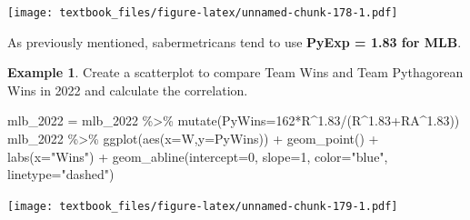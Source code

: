 \documentclass[
  11pt,
]{book}
\newenvironment{Shaded}{\begin{snugshade}}{\end{snugshade}}
\newcommand{\AttributeTok}[1]{\textcolor[rgb]{0.77,0.63,0.00}{#1}}
\newcommand{\DecValTok}[1]{\textcolor[rgb]{0.00,0.00,0.81}{#1}}
\newcommand{\FloatTok}[1]{\textcolor[rgb]{0.00,0.00,0.81}{#1}}
\newcommand{\FunctionTok}[1]{\textcolor[rgb]{0.00,0.00,0.00}{#1}}
\newcommand{\NormalTok}[1]{#1}
\newcommand{\OtherTok}[1]{\textcolor[rgb]{0.56,0.35,0.01}{#1}}
\newcommand{\SpecialCharTok}[1]{\textcolor[rgb]{0.00,0.00,0.00}{#1}}
\newcommand{\StringTok}[1]{\textcolor[rgb]{0.31,0.60,0.02}{#1}}
\theoremstyle{definition}
\theoremstyle{definition}
\newtheorem{example}{Example}[chapter]
\theoremstyle{definition}
\theoremstyle{definition}
\theoremstyle{remark}
\begin{document}
\begin{Shaded}
\end{Shaded}

\texttt{[image: textbook\_files/figure-latex/unnamed-chunk-178-1.pdf]}

\newpage

As previously mentioned, sabermetricans tend to use \textbf{PyExp = 1.83 for MLB}.

\begin{example}
Create a scatterplot to compare Team Wins and Team Pythagorean Wins in 2022 and calculate the correlation.
\end{example}

\begin{Shaded}
\begin{Highlighting}[]
\NormalTok{mlb\_2022 }\OtherTok{=}\NormalTok{ mlb\_2022 }\SpecialCharTok{\%\textgreater{}\%} \FunctionTok{mutate}\NormalTok{(}\AttributeTok{PyWins=}\DecValTok{162}\SpecialCharTok{*}\NormalTok{R}\SpecialCharTok{\^{}}\FloatTok{1.83}\SpecialCharTok{/}\NormalTok{(R}\SpecialCharTok{\^{}}\FloatTok{1.83}\SpecialCharTok{+}\NormalTok{RA}\SpecialCharTok{\^{}}\FloatTok{1.83}\NormalTok{))}
\NormalTok{mlb\_2022 }\SpecialCharTok{\%\textgreater{}\%} \FunctionTok{ggplot}\NormalTok{(}\FunctionTok{aes}\NormalTok{(}\AttributeTok{x=}\NormalTok{W,}\AttributeTok{y=}\NormalTok{PyWins)) }\SpecialCharTok{+} \FunctionTok{geom\_point}\NormalTok{() }\SpecialCharTok{+} \FunctionTok{labs}\NormalTok{(}\AttributeTok{x=}\StringTok{"Wins"}\NormalTok{) }\SpecialCharTok{+} 
  \FunctionTok{geom\_abline}\NormalTok{(}\AttributeTok{intercept=}\DecValTok{0}\NormalTok{, }\AttributeTok{slope=}\DecValTok{1}\NormalTok{, }\AttributeTok{color=}\StringTok{"blue"}\NormalTok{, }\AttributeTok{linetype=}\StringTok{"dashed"}\NormalTok{)}
\end{Highlighting}
\end{Shaded}

\texttt{[image: textbook\_files/figure-latex/unnamed-chunk-179-1.pdf]}

\begin{Shaded}
\end{Shaded}
\end{document}
